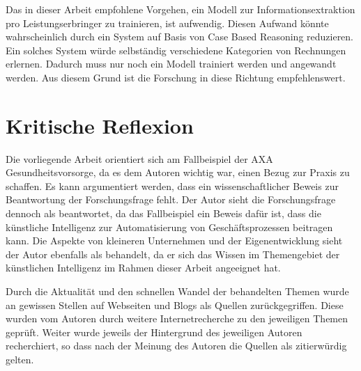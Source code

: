 Das in dieser Arbeit empfohlene Vorgehen, ein Modell zur Informationsextraktion pro Leistungserbringer zu trainieren, ist aufwendig. Diesen Aufwand könnte wahrscheinlich durch ein System auf Basis von Case Based Reasoning reduzieren. Ein solches System würde selbständig verschiedene Kategorien von Rechnungen erlernen. Dadurch muss nur noch ein Modell trainiert werden und angewandt werden. Aus diesem Grund ist die Forschung in diese Richtung empfehlenswert.

\section{Kritische Reflexion}
\label{chap:reflexion}

Die vorliegende Arbeit orientiert sich am Fallbeispiel der AXA Gesundheitsvorsorge, da es dem Autoren wichtig war, einen Bezug zur Praxis zu schaffen. Es kann argumentiert werden, dass ein wissenschaftlicher Beweis zur Beantwortung der Forschungsfrage fehlt. Der Autor sieht die Forschungsfrage dennoch als beantwortet, da das Fallbeispiel ein Beweis dafür ist, dass die künstliche Intelligenz zur Automatisierung von Geschäftsprozessen beitragen kann. Die Aspekte von kleineren Unternehmen und der Eigenentwicklung sieht der Autor ebenfalls als behandelt, da er sich das Wissen im Themengebiet der künstlichen Intelligenz im Rahmen dieser Arbeit angeeignet hat.

Durch die Aktualität und den schnellen Wandel der behandelten Themen wurde an gewissen Stellen auf Webseiten und Blogs als Quellen zurückgegriffen. Diese wurden vom Autoren durch weitere Internetrecherche zu den jeweiligen Themen geprüft. Weiter wurde jeweils der Hintergrund des jeweiligen Autoren recherchiert, so dass nach der Meinung des Autoren die Quellen als zitierwürdig gelten.